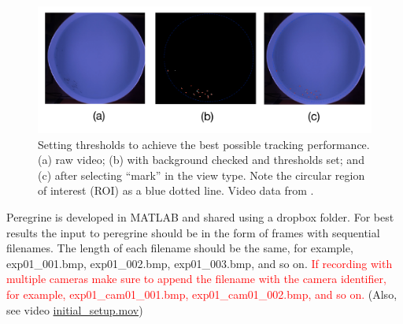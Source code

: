 \documentclass[11pt]{article}
\begin{document}
\begin{figure}[ht]
\centering
\includegraphics[width=.995\linewidth]{thresholds}
\caption{Setting thresholds to achieve the best possible tracking performance. (a) raw video; (b) with background checked and thresholds set; and (c) after selecting ``mark'' in the view type. Note the circular region of interest (ROI) as a blue dotted line. Video data from \cite{Miller2012}.}
\label{fig:thresholds}
\end{figure}
Peregrine is developed in MATLAB and shared using a dropbox folder. For best results the input to peregrine should be in the form of frames with sequential filenames. The length of each filename should be the same, for example, exp01\_001.bmp, exp01\_002.bmp, exp01\_003.bmp, and so on. \textcolor{red}{If recording with multiple cameras make sure to append the filename with the camera identifier, for example, exp01\_cam01\_001.bmp, exp01\_cam01\_002.bmp, and so on.} (Also, see video \href{run:initial\_setup.mov}{initial\_setup.mov})
\end{document}
